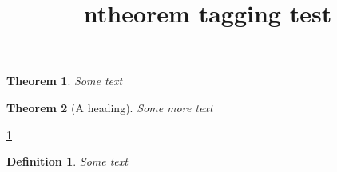 \documentclass{article}
\title{ntheorem tagging test}
\newtheorem{theorem}{Theorem}
\theoremstyle{plain}
\newtheorem{definition}{Definition}
\begin{document}

\begin{theorem}\label{thm}
Some text
\end{theorem}

\begin{theorem}[A heading]
Some more text
\end{theorem}

\ref{thm}


\begin{definition}
Some text
\end{definition}
\end{document}
